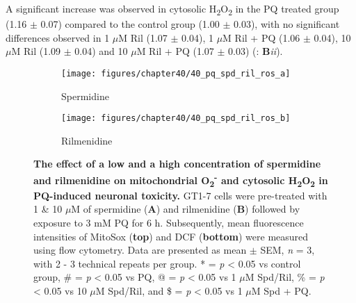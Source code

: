 A significant increase was observed in cytosolic H\textsubscript{2}O\textsubscript{2} in the PQ treated group (1.16 $\pm$ 0.07) compared to the control group (1.00 $\pm$ 0.03), with no significant differences observed in 1 $\mu$M Ril (1.07 $\pm$ 0.04), 1 $\mu$M Ril + PQ (1.06 $\pm$ 0.04), 10 $\mu$M Ril (1.09 $\pm$ 0.04) and 10 $\mu$M Ril + PQ (1.07 $\pm$ 0.03) (: \textbf{B}\textit{ii}).

\begin{figure}[!htbp]
  \center
  \begin{subfigure}[b]{0.495\linewidth}
    \texttt{[image: figures/chapter40/40\_pq\_spd\_ril\_ros\_a]}
    \caption{Spermidine}
  \end{subfigure}
  \begin{subfigure}[b]{0.495\linewidth}
    \texttt{[image: figures/chapter40/40\_pq\_spd\_ril\_ros\_b]}
    \caption{Rilmenidine}
  \end{subfigure}
  \caption[The effect of a low and a high concentration of spermidine and rilmenidine on mitochondrial O\textsubscript{2}\textsuperscript{-} and cytosolic H\textsubscript{2}O\textsubscript{2} in PQ-induced neuronal toxicity]{\textbf{The effect of a low and a high concentration of spermidine and rilmenidine on mitochondrial O\textsubscript{2}\textsuperscript{-} and cytosolic H\textsubscript{2}O\textsubscript{2} in PQ-induced neuronal toxicity.} GT1-7 cells were pre-treated with 1 \& 10 $\mu$M of spermidine (\textbf{A}) and rilmenidine (\textbf{B}) followed by exposure to 3 mM PQ for 6 h. Subsequently,  mean fluorescence intensities of MitoSox (\textbf{top}) and DCF (\textbf{bottom}) were measured using flow cytometry. Data are presented as mean $\pm$ SEM, \textit{n} = 3, with 2 - 3 technical repeats per group. * = \textit{p} < 0.05 vs control group, \# = \textit{p} < 0.05 vs PQ, @ = \textit{p} < 0.05 vs 1 $\mu$M Spd/Ril, \% = \textit{p} < 0.05 vs 10 $\mu$M Spd/Ril, and \$ = \textit{p} < 0.05 vs 1 $\mu$M Spd + PQ.}
  \label{fig:40_pq_spd_ril_ros_a}
\end{figure} 


